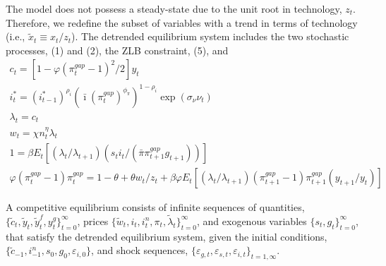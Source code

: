 \documentclass[12pt, final]{article}
\begin{document}
    The model does not possess a steady-state due to the unit root in technology, $z_t$. Therefore, we redefine the subset of variables with a trend in terms of technology (i.e., $\tilde{x}_t \equiv x_t/z_t$). The detrended equilibrium system includes the two stochastic processes, (1) and (2), the ZLB constraint, (5), and
      \begin{gather}
c_t = [1-\varphi(\pi_t^{gap}-1)^2/2]y_t\\
i_t^*=(i^*_{t-1})^{\rho_i}(\bar{\imath}(\pi^{gap}_t)^{\phi_\pi})^{1-\rho_i}\exp(\sigma_\nu\nu_t)\\
\lambda_t = c_t \\
w_t = \chi n_t^\eta \lambda_t\\
1 =  \beta E_t[(\lambda_t/\lambda_{t+1})(s_ti_t/(\bar{\pi}\pi_{t+1}^{gap}g_{t+1}))]\\
\varphi(\pi_t^{gap}-1)\pi_t^{gap} = 1-\theta + \theta w_t/z_t + \beta\varphi E_t[(\lambda_t/\lambda_{t+1})(\pi_{t+1}^{gap}-1)\pi_{t+1}^{gap}(y_{t+1}/y_t)]
      \end{gather}

A competitive equilibrium consists of infinite sequences of quantities, $\{\tilde{c}_t, \tilde{y}_t, \tilde{y}_t^f, y_t^g\}_{t=0}^\infty$, prices $\{\tilde{w}_t, i_t, i^n_t, \pi_t, \tilde{\lambda}_t\}_{t=0}^\infty$, and exogenous variables $\{s_t, g_t\}_{t=0}^\infty$, that satisfy the detrended equilibrium system, given the initial conditions, $\{\tilde{c}_{-1}, i^n_{-1}, s_0, g_0, \varepsilon_{i,0}\}$, and shock sequences, $\{\varepsilon_{g,t}, \varepsilon_{s,t}, \varepsilon_{i,t}\}_{t=1,\infty}$. 
\end{document}

